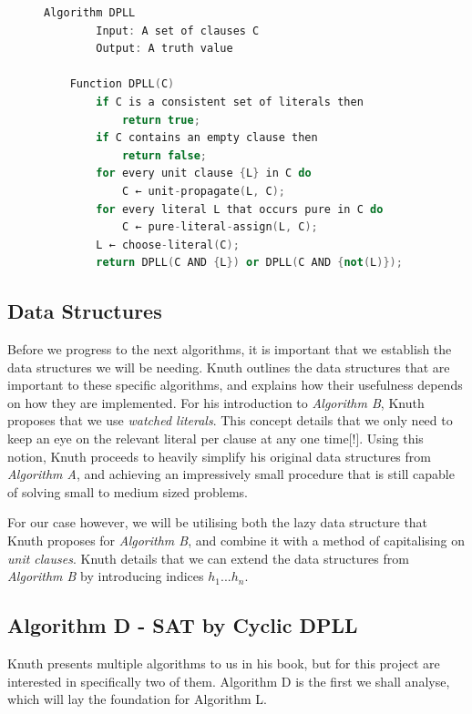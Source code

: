 \documentclass{article}
\begin{document}
\begin{figure}[h]
    \centering
    \begin{lstlisting}[language=C++]
    Algorithm DPLL
        Input: A set of clauses C
        Output: A truth value

    Function DPLL(C)
        if C is a consistent set of literals then
            return true;
        if C contains an empty clause then
            return false;
        for every unit clause {L} in C do
            C ← unit-propagate(L, C);
        for every literal L that occurs pure in C do
            C ← pure-literal-assign(L, C);
        L ← choose-literal(C);
        return DPLL(C AND {L}) or DPLL(C AND {not(L)});
\end{lstlisting}
\end{figure}

\subsection{Data Structures}
Before we progress to the next algorithms, it is important that we establish the data structures we will be needing. Knuth
outlines the data structures that are important to these specific algorithms, and explains how their usefulness depends on how
they are implemented. For his introduction to \textit{Algorithm B}, Knuth proposes that we use \textit{watched literals}. This
concept details that we only need to keep an eye on the relevant literal per clause at any one time[!]. Using this notion, Knuth
proceeds to heavily simplify his original data structures from \textit{Algorithm A}, and achieving an impressively small
procedure that is still capable of solving small to medium sized problems.

For our case however, we will be utilising both the lazy data structure that Knuth proposes for \textit{Algorithm B}, and combine
it with a method of capitalising on \textit{unit clauses}. Knuth details that we can extend the data structures from \textit{Algorithm B} by introducing indices $h_1...h_n$.


\subsection{Algorithm D - SAT by Cyclic DPLL}
Knuth presents multiple algorithms to us in his book, but for this project are interested in specifically two of them. Algorithm D
is the first we shall analyse, which will lay the foundation for Algorithm L.
\end{document}
